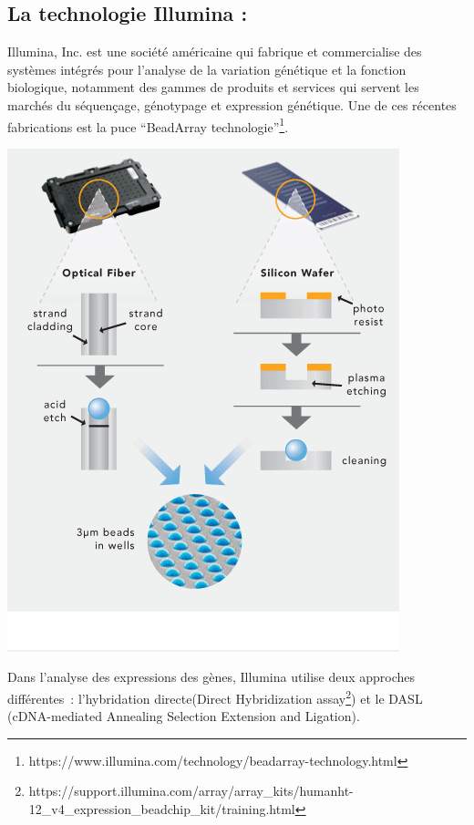 \documentclass[a4paper,10pt]{article}
\begin{document}
\subsection{La technologie Illumina :}
Illumina, Inc. est une société américaine qui fabrique et commercialise des systèmes intégrés pour l'analyse de la variation génétique et la fonction biologique, 
notamment des gammes de produits et services qui servent les marchés du séquençage, génotypage et expression génétique.
\newline
Une de ces récentes fabrications est la puce ``BeadArray technologie''\footnote{https://www.illumina.com/technology/beadarray-technology.html}.
\begin{center}
 \includegraphics[scale=0.5]{./image/beadarray.png}
\end{center}
Dans l’analyse des expressions des gènes, Illumina utilise deux approches différentes : l’hybridation directe(Direct Hybridization assay\footnote{https://support.illumina.com/array/array\_kits/humanht-12\_v4\_expression\_beadchip\_kit/training.html}) et le DASL (cDNA-mediated Annealing Selection Extension and Ligation).
\end{document}
